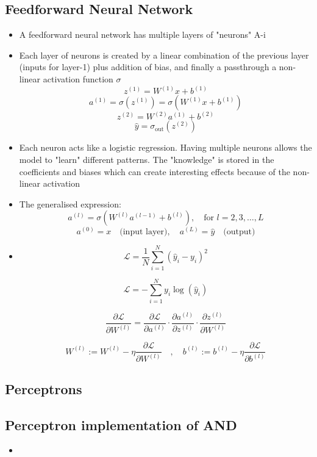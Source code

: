 \documentclass[12pt,a4paper]{article}
\begin{document}
\subsection{Feedforward Neural Network}
\begin{itemize}
\item A feedforward neural network has multiple layers of "neurons" A-i
\item Each layer of neurons is created by a linear combination of the previous layer (inputs for layer-1) plus addition of bias, and finally a passthrough a non-linear activation function $ \sigma$
\[ z^{(1)} = W^{(1)}x + b^{(1)} \]
\[ a^{(1)} = \sigma(z^{(1)}) = \sigma(W^{(1)}x + b^{(1)}) \]
\[ z^{(2)} = W^{(2)}a^{(1)} + b^{(2)} \]
\[ \hat{y} = \sigma_{\text{out}}(z^{(2)}) \]
\item Each neuron acts like a logistic regression. Having multiple neurons allows the model to "learn" different patterns. The "knowledge" is stored in the coefficients and biases which can create interesting effects because of the non-linear activation
\item The generalised expression:
\[ a^{(l)} = \sigma(W^{(l)}a^{(l-1)} + b^{(l)}), \quad \text{for } l = 2, 3, \dots, L \]
\[ a^{(0)} = x \quad \text{(input layer)}, \quad a^{(L)} = \hat{y} \quad \text{(output)} \]
\item 
\[ \mathcal{L} = \frac{1}{N} \sum_{i=1}^{N} (\hat{y}_i - y_i)^2 \]

\[ \mathcal{L} = -\sum_{i=1}^{N} y_i \log(\hat{y}_i) \]

\[ \frac{\partial \mathcal{L}}{\partial W^{(l)}} = \frac{\partial \mathcal{L}}{\partial a^{(l)}} \cdot \frac{\partial a^{(l)}}{\partial z^{(l)}} \cdot \frac{\partial z^{(l)}}{\partial W^{(l)}} \]

\[ W^{(l)} := W^{(l)} - \eta \frac{\partial \mathcal{L}}{\partial W^{(l)}} \quad,\quad b^{(l)} := b^{(l)} - \eta \frac{\partial \mathcal{L}}{\partial b^{(l)}} \]

\end{itemize}

\subsection{Perceptrons}
\subsection{Perceptron implementation of AND}
\begin{itemize}
\item 
\end{itemize}
\end{document}
